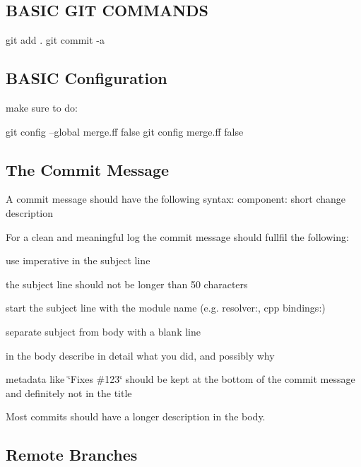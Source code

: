 \subsection*{B\+A\+S\+I\+C G\+I\+T C\+O\+M\+M\+A\+N\+D\+S}

\begin{DoxyVerb}    git add .
    git commit -a
\end{DoxyVerb}


\subsection*{B\+A\+S\+I\+C Configuration}

make sure to do\+: \begin{DoxyVerb}    git config --global merge.ff false
    git config merge.ff false
\end{DoxyVerb}


\subsection*{The Commit Message}

A commit message should have the following syntax\+: {\ttfamily component\+: short change description}

For a clean and meaningful log the commit message should fullfil the following\+:


\begin{DoxyItemize}
\item use imperative in the subject line
\item the subject line should not be longer than 50 characters
\item start the subject line with the module name (e.\+g. resolver\+:, cpp bindings\+:)
\item separate subject from body with a blank line
\item in the body describe in detail what you did, and possibly why
\item metadata like \char`\"{}\+Fixes \#123\char`\"{} should be kept at the bottom of the commit message and definitely not in the title
\end{DoxyItemize}

Most commits should have a longer description in the body.

\subsection*{Remote Branches}

